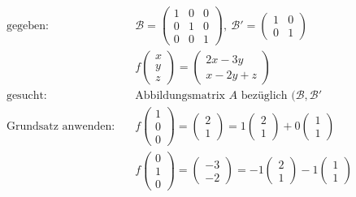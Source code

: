 \documentclass[11pt]{article}
\begin{document}
\begin{equation*}
\begin{split}
	\text{gegeben:}\quad & \mathcal{B} = \begin{pmatrix}
		1 & 0 & 0 \\ 0 & 1 & 0 \\ 0 & 0 & 1
	\end{pmatrix},\ \mathcal{B'} = \begin{pmatrix}
		1 & 0 \\ 0 & 1
	\end{pmatrix} \\
	& f\begin{pmatrix}
		x \\ y \\ z
	\end{pmatrix} = \begin{pmatrix}
		2x-3y \\ x - 2y + z
	\end{pmatrix} \\
	\text{gesucht:} \quad & \text{Abbildungsmatrix $A$ bezüglich $(\mathcal{B}, \mathcal{B'}$} \\
	\text{Grundsatz anwenden:} \quad & f\begin{pmatrix}
		1 \\ 0 \\ 0
	\end{pmatrix} = \begin{pmatrix}
		2 \\ 1
	\end{pmatrix} = 1\begin{pmatrix}
		2 \\ 1
	\end{pmatrix} + 0\begin{pmatrix}
		1 \\ 1
	\end{pmatrix} \\
	& f\begin{pmatrix}
		0 \\ 1 \\ 0
	\end{pmatrix} = \begin{pmatrix}
		-3 \\ -2
	\end{pmatrix} = -1\begin{pmatrix}
		2 \\ 1
	\end{pmatrix} -1 \begin{pmatrix}
		1 \\ 1
	\end{pmatrix} \\

\end{split}
\end{equation*}
\end{document}
